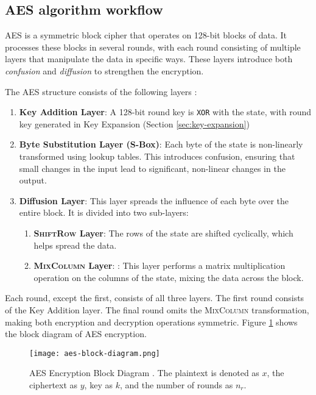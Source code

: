 \subsection{AES algorithm workflow}

\Gls{AES} is a symmetric block cipher that operates on 128-bit blocks of data.
It processes these blocks in several rounds, with each round consisting of multiple layers that manipulate the data in specific ways. 
These layers introduce both \textit{confusion} and \textit{diffusion} to strengthen the encryption.

The AES structure consists of the following layers \cite{Paar2024}:
\begin{enumerate}
    \item \textbf{Key Addition Layer}:
    A 128-bit round key is \texttt{XOR} with the state, with round key generated in Key Expansion (Section \ref{sec:key-expansion})

    \item \textbf{Byte Substitution Layer (S-Box)}:
    Each byte of the state is non-linearly transformed using lookup tables. 
    This introduces confusion, ensuring that small changes in the input lead to significant, non-linear changes in the output.
    
    \item \textbf{Diffusion Layer}:
    This layer spreads the influence of each byte over the entire block. 
    It is divided into two sub-layers:
    \begin{enumerate}
        \item \textbf{\textsc{ShiftRow} Layer}: The rows of the state are shifted cyclically, which helps spread the data. %
        \item \textbf{\textsc{MixColumn} Layer}: : This layer performs a matrix multiplication operation on the columns of the state, mixing the data across the block. %
    \end{enumerate}
\end{enumerate}

Each round, except the first, consists of all three layers. 
The first round consists of the Key Addition layer.
The final round omits the \textsc{MixColumn} transformation, making both encryption and decryption operations symmetric.
Figure \ref{fig:aes-block-diagram} shows the block diagram of AES encryption.

\begin{figure}[!ht]
    \centering
    \texttt{[image: aes-block-diagram.png]} %
    \caption{
        AES Encryption Block Diagram \cite{Paar2024}.
        The plaintext is denoted as $x$, the ciphertext as $y$, key as $k$, and the number of rounds as $n_r$.
    }
    \label{fig:aes-block-diagram}
\end{figure}